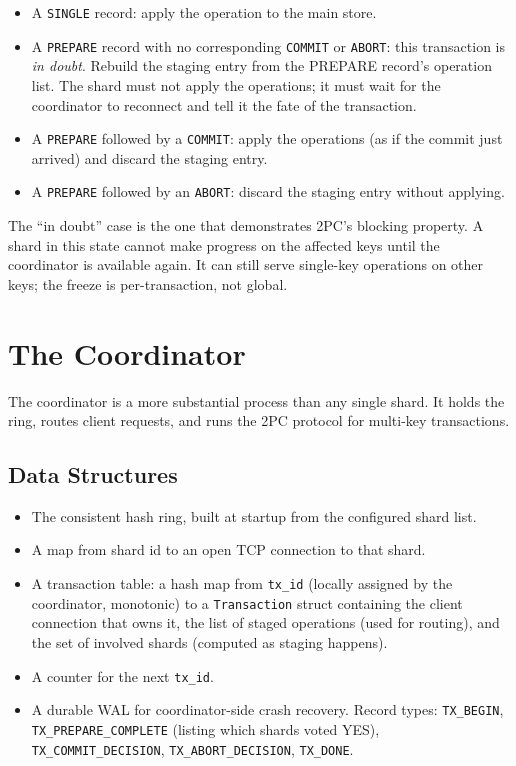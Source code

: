 \documentclass[11pt,a4paper]{article}
\begin{document}
\begin{itemize}
\item A \texttt{SINGLE} record: apply the operation to the main store.
\item A \texttt{PREPARE} record with no corresponding \texttt{COMMIT} or \texttt{ABORT}: this transaction is \textit{in doubt}. Rebuild the staging entry from the PREPARE record's operation list. The shard must not apply the operations; it must wait for the coordinator to reconnect and tell it the fate of the transaction.
\item A \texttt{PREPARE} followed by a \texttt{COMMIT}: apply the operations (as if the commit just arrived) and discard the staging entry.
\item A \texttt{PREPARE} followed by an \texttt{ABORT}: discard the staging entry without applying.
\end{itemize}

The ``in doubt'' case is the one that demonstrates 2PC's blocking property. A shard in this state cannot make progress on the affected keys until the coordinator is available again. It can still serve single-key operations on other keys; the freeze is per-transaction, not global.

\section{The Coordinator}

The coordinator is a more substantial process than any single shard. It holds the ring, routes client requests, and runs the 2PC protocol for multi-key transactions.

\subsection{Data Structures}
\begin{itemize}
\item The consistent hash ring, built at startup from the configured shard list.
\item A map from shard id to an open TCP connection to that shard.
\item A transaction table: a hash map from \texttt{tx\_id} (locally assigned by the coordinator, monotonic) to a \texttt{Transaction} struct containing the client connection that owns it, the list of staged operations (used for routing), and the set of involved shards (computed as staging happens).
\item A counter for the next \texttt{tx\_id}.
\item A durable WAL for coordinator-side crash recovery. Record types: \texttt{TX\_BEGIN}, \texttt{TX\_PREPARE\_COMPLETE} (listing which shards voted YES), \texttt{TX\_COMMIT\_DECISION}, \texttt{TX\_ABORT\_DECISION}, \texttt{TX\_DONE}.
\end{itemize}
\end{document}
